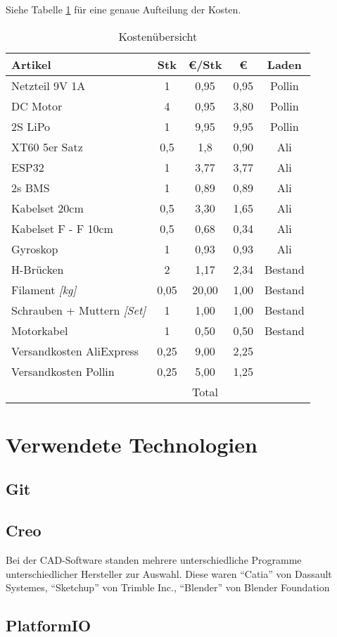Siehe Tabelle \ref{table:Kosten} für eine genaue Aufteilung der Kosten.
\begin{table}[!htbp]
	\centering
\begin{tabular}{|l|c|c|c|c|}
	\hline
	Artikel & Stk & \euro/Stk & \euro & Laden\\
	\hline
	\hline
	Netzteil 9V 1A & 1 & 0,95 & 0,95 & Pollin\\
	\hline
	DC Motor & 4 & 0,95 & 3,80 & Pollin\\
	\hline
	2S LiPo & 1 & 9,95 & 9,95 & Pollin\\
	\hline
	XT60 5er Satz & 0,5 & 1,8 & 0,90 & Ali\\
	\hline
	ESP32 & 1 & 3,77 & 3,77 & Ali\\
	\hline
	2s BMS & 1 & 0,89 & 0,89 & Ali\\
	\hline
	Kabelset 20cm & 0,5 & 3,30 & 1,65 & Ali\\
	\hline
	Kabelset F - F 10cm & 0,5 & 0,68 & 0,34 & Ali\\
	\hline
	Gyroskop & 1 & 0,93 & 0,93 & Ali\\
	\hline
	H-Brücken & 2 & 1,17 & 2,34 & Bestand\\
	\hline
	Filament \textit{[kg]} & 0,05 & 20,00 & 1,00 & Bestand\\
	\hline
	Schrauben + Muttern \textit{[Set]} & 1 & 1,00 & 1,00 & Bestand\\
	\hline
	Motorkabel & 1 & 0,50 & 0,50 & Bestand\\
	\hline
	Versandkosten AliExpress & 0,25 & 9,00 & 2,25 & \\
	\hline
	Versandkosten Pollin & 0,25 & 5,00 & 1,25 & \\
	\hline
	\hline
	 &  & Total & \EUR{31,52} & \\
	\hline	
\end{tabular} 
\caption{Kostenübersicht} 
\label{table:Kosten}
\end{table} 



\section{Verwendete Technologien}

\subsection{Git}
\subsection{Creo}
Bei der CAD-Software standen mehrere unterschiedliche Programme unterschiedlicher Hersteller zur Auswahl.
Diese waren ``Catia'' von Dassault Systemes, ``Sketchup'' von Trimble Inc., ``Blender'' von Blender Foundation
\subsection{PlatformIO}